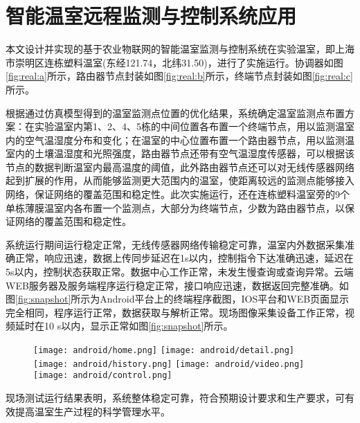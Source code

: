 \section{智能温室远程监测与控制系统应用}
本文设计并实现的基于农业物联网的智能温室监测与控制系统在实验温室，即上海市崇明区连栋塑料温室(东经121.74，北纬31.50)，进行了实施运行。协调器如图\ref{fig:real:a}所示，路由器节点封装如图\ref{fig:real:b}所示，终端节点封装如图\ref{fig:real:c}所示。

\begin{figure}[!htbp]
	\centering
\end{figure}
根据通过仿真模型得到的温室监测点位置的优化结果，系统确定温室监测点布置方案：在实验温室内第1、2、4、5栋的中间位置各布置一个终端节点，用以监测温室内的空气温湿度分布和变化；在温室的中心位置布置一个路由器节点，用以监测温室内的土壤温湿度和光照强度，路由器节点还带有空气温湿度传感器，可以根据该节点的数据判断温室内最高温度的阈值，此外路由器节点还可以对无线传感器网络起到扩展的作用，从而能够监测更大范围内的温室，使距离较远的监测点能够接入网络，保证网络的覆盖范围和稳定性。此次实施运行，还在连栋塑料温室旁的9个单栋薄膜温室内各布置一个监测点，大部分为终端节点，少数为路由器节点，以保证网络的覆盖范围和稳定性。

系统运行期间运行稳定正常，无线传感器网络传输稳定可靠，温室内外数据采集准确正常，响应迅速，数据上传同步延迟在1s以内，控制指令下达准确迅速，延迟在5s以内，控制状态获取正常。数据中心工作正常，未发生慢查询或查询异常。云端WEB服务器及服务端程序运行稳定正常，接口响应迅速，数据返回完整准确。如图\ref{fig:snapshot}所示为Android平台上的终端程序截图，IOS平台和WEB页面显示完全相同，程序运行正常，数据获取与解析正常。现场图像采集设备工作正常，视频延时在10 s以内，显示正常如图\ref{fig:snapshot}所示。

	\begin{figure}[!htbp]
		\centering
		\texttt{[image: android/home.png]}
		\texttt{[image: android/detail.png]}
		\texttt{[image: android/history.png]}
		\texttt{[image: android/video.png]}
		\texttt{[image: android/control.png]}	
	\end{figure}
现场测试运行结果表明，系统整体稳定可靠，符合预期设计要求和生产要求，可有效提高温室生产过程的科学管理水平。

